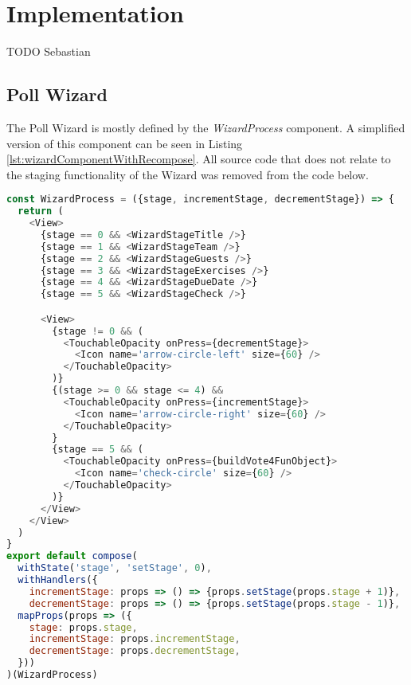\section{Implementation}
\label{sec:implementation}

TODO Sebastian

\subsection{Poll Wizard}
\label{ssec:poll_wizard}

The Poll Wizard is mostly defined by the \textit{WizardProcess} component. A simplified version of this component can be seen in Listing \ref{lst:wizardComponentWithRecompose}. All source code that does not relate to the staging functionality of the Wizard was removed from the code below.

\begin{lstlisting}[language=javascript,caption=Simplified Wizard Component using \textit{recompose},label=lst:wizardComponentWithRecompose]
const WizardProcess = ({stage, incrementStage, decrementStage}) => {
  return (
    <View>
      {stage == 0 && <WizardStageTitle />}
      {stage == 1 && <WizardStageTeam />}
      {stage == 2 && <WizardStageGuests />}
      {stage == 3 && <WizardStageExercises />}
      {stage == 4 && <WizardStageDueDate />}
      {stage == 5 && <WizardStageCheck />}

      <View>
        {stage != 0 && (
          <TouchableOpacity onPress={decrementStage}>
            <Icon name='arrow-circle-left' size={60} />
          </TouchableOpacity>
        )}
        {(stage >= 0 && stage <= 4) &&
          <TouchableOpacity onPress={incrementStage}>
            <Icon name='arrow-circle-right' size={60} />
          </TouchableOpacity>
        }
        {stage == 5 && (
          <TouchableOpacity onPress={buildVote4FunObject}>
            <Icon name='check-circle' size={60} />
          </TouchableOpacity>
        )}
      </View>
    </View>
  )
}
export default compose(
  withState('stage', 'setStage', 0),
  withHandlers({
    incrementStage: props => () => {props.setStage(props.stage + 1)},
    decrementStage: props => () => {props.setStage(props.stage - 1)},
  mapProps(props => ({
    stage: props.stage,
    incrementStage: props.incrementStage,
    decrementStage: props.decrementStage,
  }))
)(WizardProcess)
\end{lstlisting}

